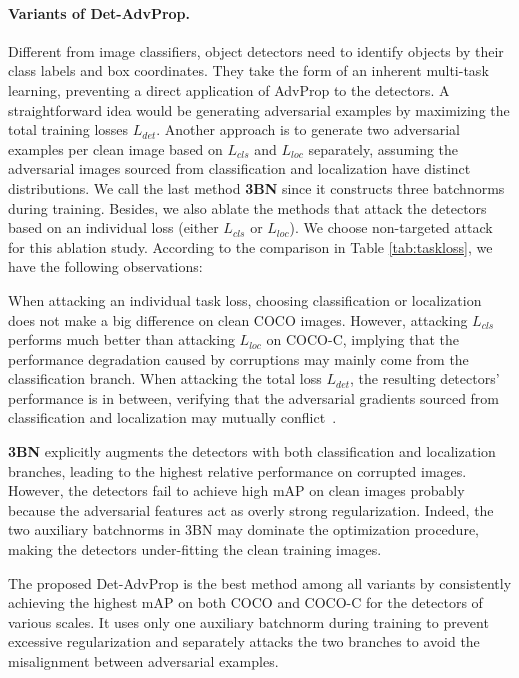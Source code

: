 \documentclass[final]{cvpr}
\begin{document}
\paragraph{Variants of Det-AdvProp.}
Different from image classifiers, object detectors need to identify objects by their class labels and box coordinates. They take the form of an inherent multi-task learning, preventing a direct application of AdvProp to the detectors. A straightforward idea would be generating adversarial examples by maximizing the total training losses $L_{det}$.
Another approach is to generate two adversarial examples per clean image based on $L_{cls}$ and $L_{loc}$ separately, assuming the adversarial images sourced from classification and localization have distinct distributions. 
We call the last method \textbf{3BN} since it constructs three batchnorms during training.
Besides, we also ablate the methods that attack the detectors based on an individual loss (either $L_{cls}$ or $L_{loc}$).
We choose non-targeted attack for this ablation study.
According to the comparison in Table \ref{tab:taskloss}, we have the following observations:

\begin{compactitem}
\vspace{0.2em}
    \item When attacking an individual task loss, choosing classification or localization does not make a big difference on clean COCO images. 
    However, attacking $L_{cls}$ performs much better than attacking $L_{loc}$  on COCO-C, implying that the performance degradation caused by corruptions may mainly come from the classification branch. 
When attacking the total loss $L_{det}$, the resulting detectors' performance is in between, verifying that the adversarial gradients sourced from classification and localization may mutually conflict~\cite{zhang2019towards}.
    \vspace{0.2em}
    \item \textbf{3BN} explicitly augments the detectors with both classification and localization branches, leading to the highest relative performance on corrupted images. However, the detectors fail to achieve high mAP on clean images probably because the adversarial features act as overly strong regularization. Indeed, the two auxiliary batchnorms in 3BN may dominate the optimization procedure, making the detectors under-fitting the clean training images.
    \vspace{0.2em}
    \item The proposed Det-AdvProp is the best method among all variants by consistently achieving the highest mAP on both COCO and COCO-C for the detectors of various scales.
    It uses only one auxiliary batchnorm during training to prevent excessive regularization and separately attacks the two branches to avoid the misalignment between adversarial examples.
\end{compactitem}
\end{document}
